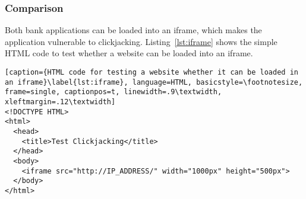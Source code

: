 \subsubsection{Comparison}
Both bank applications can be loaded into an iframe, which makes the application vulnerable to clickjacking. Listing~\ref{lst:iframe} shows the simple HTML code to test whether a website can be loaded into an iframe.

\begin{lstlisting}[caption={HTML code for testing a website whether it can be loaded in an iframe}\label{lst:iframe}, language=HTML, basicstyle=\footnotesize, frame=single, captionpos=t, linewidth=.9\textwidth, xleftmargin=.12\textwidth]
<!DOCTYPE HTML>
<html>
  <head>
    <title>Test Clickjacking</title>
  </head>
  <body>
    <iframe src="http://IP_ADDRESS/" width="1000px" height="500px">
  </body>
</html>
\end{lstlisting}
\clearpage
